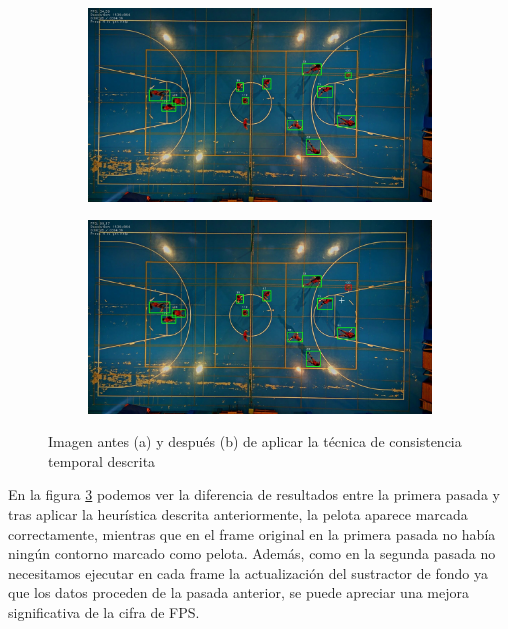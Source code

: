 \begin{figure}
\begin{subfigure}{.5\textwidth}
  \centering
  \includegraphics[width=.9\linewidth]{images/noconsistencia}
  \caption { }
  \label{fig:consa}
\end{subfigure}%
\begin{subfigure}{.5\textwidth}
  \centering
  \includegraphics[width=.9\linewidth]{images/consistencia}
  \caption { }
  \label{fig:consb}
\end{subfigure}
\caption{Imagen antes (a) y después (b) de aplicar la técnica de consistencia temporal descrita}
\label{fig:cons}
\end{figure}

En la figura \ref{fig:cons} podemos ver la diferencia de resultados entre la primera pasada y tras aplicar la heurística descrita anteriormente, la pelota aparece marcada correctamente, mientras que en el frame original en la primera pasada no había ningún contorno marcado como pelota. Además, como en la segunda pasada no necesitamos ejecutar en cada frame la actualización del sustractor de fondo ya que los datos proceden de la pasada anterior, se puede apreciar una mejora significativa de la cifra de FPS.

